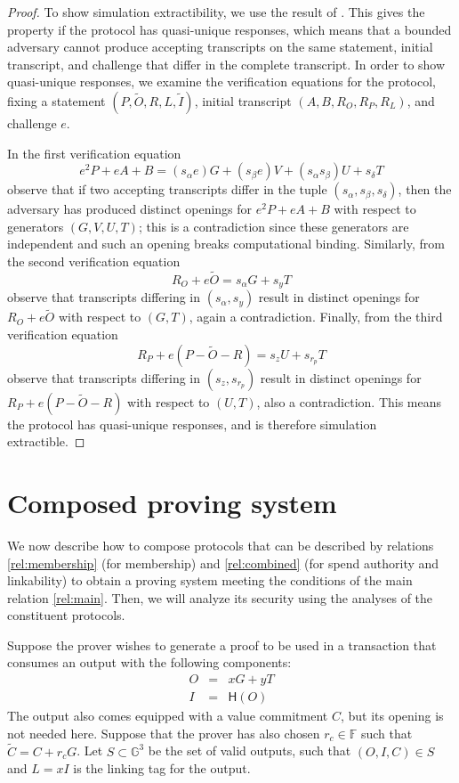 \documentclass{article}
\theoremstyle{definition}
\newcommand{\GG}{\mathbb{G}}
\newcommand{\FF}{\mathbb{F}}
\newcommand{\hash}{\mathsf{H}}
\newcommand{\wt}[1]{\widetilde{#1}}
\begin{document}
\begin{proof}
	To show simulation extractibility, we use the result of \cite{sim_ext}.
	This gives the property if the protocol has quasi-unique responses, which means that a bounded adversary cannot produce accepting transcripts on the same statement, initial transcript, and challenge that differ in the complete transcript.
	In order to show quasi-unique responses, we examine the verification equations for the protocol, fixing a statement $(P, \wt{O}, R, L, \wt{I})$, initial transcript $(A, B, R_O, R_P, R_L)$, and challenge $e$.

	In the first verification equation
	$$e^2 P + e A + B = (s_\alpha e) G + (s_\beta e) V + (s_\alpha s_\beta) U + s_\delta T$$
	observe that if two accepting transcripts differ in the tuple $(s_\alpha, s_\beta, s_\delta)$, then the adversary has produced distinct openings for $e^2 P + e A + B$ with respect to generators $(G, V, U, T)$; this is a contradiction since these generators are independent and such an opening breaks computational binding.
	Similarly, from the second verification equation
	$$R_O + e \wt{O} = s_\alpha G + s_y T$$
	observe that transcripts differing in $(s_\alpha, s_y)$ result in distinct openings for $R_O + e \wt{O}$ with respect to $(G, T)$, again a contradiction.
	Finally, from the third verification equation
	$$R_P + e (P - \wt{O} - R) = s_z U + s_{r_p} T$$
	observe that transcripts differing in $(s_z, s_{r_p})$ result in distinct openings for $R_P + e (P - \wt{O} - R)$ with respect to $(U, T)$, also a contradiction.
	This means the protocol has quasi-unique responses, and is therefore simulation extractible.
\end{proof}


\section{Composed proving system}

We now describe how to compose protocols that can be described by relations \ref{rel:membership} (for membership) and \ref{rel:combined} (for spend authority and linkability) to obtain a proving system meeting the conditions of the main relation \ref{rel:main}.
Then, we will analyze its security using the analyses of the constituent protocols.

Suppose the prover wishes to generate a proof to be used in a transaction that consumes an output with the following components:
\begin{eqnarray*}
	O &=& x G + y T \\
	I &=& \hash(O)
\end{eqnarray*}
The output also comes equipped with a value commitment $C$, but its opening is not needed here.
Suppose that the prover has also chosen $r_c \in \FF$ such that $\wt{C} = C + r_c G$.
Let $S \subset \GG^3$ be the set of valid outputs, such that $(O, I, C) \in S$ and $L = x I$ is the linking tag for the output.
\end{document}
